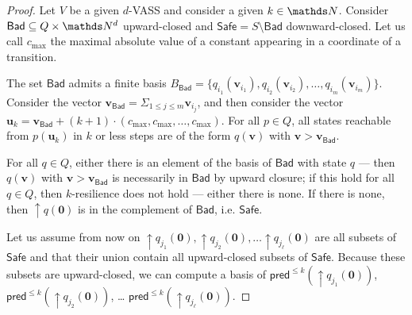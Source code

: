 \documentclass[runningheads]{llncs}
\newcommand{\pred}{\textsf{pred}}
\newcommand{\Bad}{\textsf{Bad}}
\newcommand{\Safe}{\textsf{Safe}}
\begin{document}
\begin{proof}
Let $V$ be a given $d$-VASS and consider a given $k \in \N$.
Consider $\Bad \subseteq Q \times \N^d$ upward-closed and 
$\Safe = S \setminus \Bad$
 downward-closed.
Let us call $c_{\max}$ the maximal absolute value of a constant appearing in a coordinate of a transition.

The set $\Bad$ admits a finite basis 
$B_\Bad = \{ q_{i_1}(\textbf{v}_{i_1}), q_{i_2}(\textbf{v}_{i_2}), \ldots,
q_{i_m}(\textbf{v}_{i_m}) \}$.
Consider the vector $\textbf{v}_{\Bad} = \Sigma_{1 \leq j \leq m} \textbf{v}_{i_j}$,
and then consider the vector
$\textbf{u}_k = \textbf{v}_{\Bad} + (k+1) \cdot (c_{\max}, c_{\max}, \ldots, c_{\max})$.
For all $p \in Q$, all states reachable from $p(\textbf{u}_k)$ in $k$ or less steps are 
of the form $q(\textbf{v})$ with $ \textbf{v} > \textbf{v}_{\Bad}$.

For all $q \in Q$, either there is an element of the basis of $\Bad$ with state $q$ \----
then $q(\textbf{v})$ with $\textbf{v} > \textbf{v}_{\Bad}$ is necessarily in $\Bad$ by upward closure; if this hold for all $q \in Q$, then $k$-resilience does not hold \---- either there is none. If there is none, then 
$\mathop{\uparrow} q(\textbf{0})$
 is in the complement of $\Bad$, i.e. $\Safe$.

Let us assume from now on 
 $\mathop{\uparrow} q_{j_1}(\textbf{0}), \mathop{\uparrow} q_{j_2}(\textbf{0}), \ldots \mathop{\uparrow} q_{j_\ell}(\textbf{0})$ are
all subsets of $\Safe$ and that their union contain all upward-closed subsets of $\Safe$.
Because these subsets are upward-closed, we can compute a basis of
$\pred^{\leq k}(\mathop{\uparrow} q_{j_1}(\textbf{0}))$, $\pred^{\leq k}(\mathop{\uparrow} q_{j_2}(\textbf{0}))$, \ldots
$\pred^{\leq k}(\mathop{\uparrow} q_{j_\ell}(\textbf{0}))$.



\end{proof}
\end{document}
